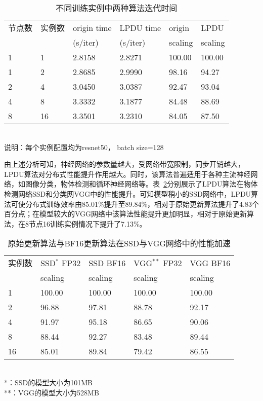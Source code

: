 \begin{table}[htbp]
  \centering
  \caption{不同训练实例中两种算法迭代时间}
  \label{tab:fp32_bf16_real_iter_time}
  \begin{minipage}[t]{0.9\textwidth} 
    \begin{tabularx}{\linewidth}{|l|X|X|X|X|X|}
      \hline
      节点数 & 实例数 & origin time & LPDU time & origin & LPDU \\
       &  & (s/iter) & (s/iter) & scaling & scaling\\
      \hline
1 & 1 & 2.8158 & 2.8271 & 100.00 & 100.00 \\
1 & 2 & 2.8685 & 2.9990 & 98.16 & 94.27 \\
2 & 4 & 3.0450 & 3.0387 & 92.47 & 93.04 \\
4 & 8 & 3.3332 & 3.1877 & 84.48 & 88.69 \\
8 & 16 & 3.3501 & 3.2310 & 84.05 & 87.50 \\
      \hline
    \end{tabularx}\\[2pt]
    \footnotesize
    说明：每个实例配置均为resnet50， batch size=128\\
  \end{minipage}
\end{table}

由上述分析可知，神经网络的参数量越大，受网络带宽限制，同步开销越大，LPDU算法对分布式性能提升作用越大。同时，该算法普遍适用于各种主流神经网络，如图像分类，物体检测和循环神经网络等。表~\ref{tab:ssd_vgg_scaling}分别展示了LPDU算法在物体检测网络SSD和分类网VGG中的性能提升。可知模型稍小的SSD网络中，LPDU算法可使分布式训练效率由85.01\%提升至89.84\%，相对于原始更新算法提升了4.83个百分点；在模型较大的VGG网络中该算法性能提升更加明显，相对于原始更新算法，在8节点16训练实例情况下提升了7.13\%。
\begin{table}[htbp]
  \centering
  \caption{原始更新算法与BF16更新算法在SSD与VGG网络中的性能加速}
  \label{tab:ssd_vgg_scaling}
  \begin{minipage}[t]{0.8\textwidth} 
    \begin{tabularx}{\linewidth}{|l|X|X|X|X|}
      \hline
      实例数 & SSD$^{*}$ FP32 & SSD BF16 & VGG$^{**}$ FP32 & VGG BF16 \\
       & scaling & scaling & scaling & scaling\\
      \hline
1 & 100.00 & 100.00 & 100.00 & 100.00 \\
2 & 96.88 & 97.81 & 88.78 & 92.17 \\
4 & 91.97 & 95.18 & 86.65 & 90.06 \\
8 & 88.44 & 92.27 & 83.48 & 89.44 \\
16 & 85.01 & 89.84 & 79.42 & 86.55 \\
      \hline
    \end{tabularx}\\[2pt]
    \footnotesize
    *：SSD的模型大小为101MB\\
    **：VGG的模型大小为528MB
  \end{minipage}
\end{table}

